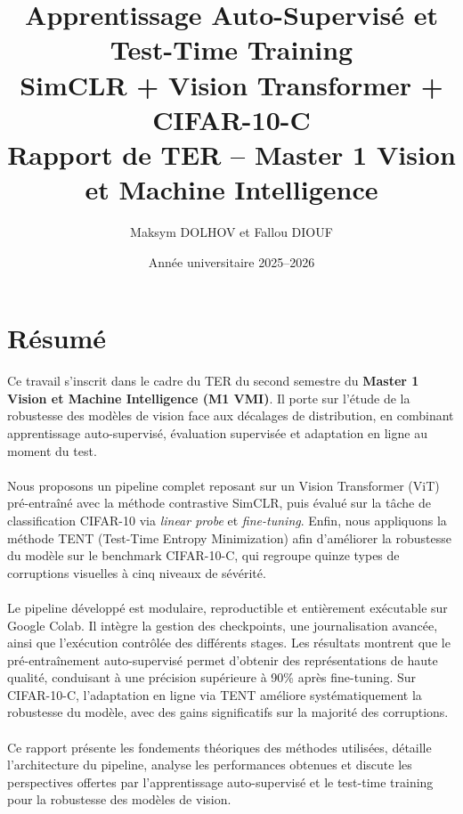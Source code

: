 \documentclass[12pt,a4paper]{report}
\title{%
	\textbf{Apprentissage Auto-Supervisé et Test-Time Training}\\
	\large SimCLR + Vision Transformer + CIFAR-10-C\\
	\large Rapport de TER – Master 1 Vision et Machine Intelligence
}
\author{Maksym DOLHOV et Fallou DIOUF}
\date{Année universitaire 2025–2026}
\begin{document}
	
	\maketitle
	\tableofcontents
	
	\chapter*{Résumé}
	Ce travail s’inscrit dans le cadre du TER du second semestre du \textbf{Master 1 Vision et Machine Intelligence (M1 VMI)}. Il porte sur l’étude de la robustesse des modèles de vision face aux décalages de distribution, en combinant apprentissage auto-supervisé, évaluation supervisée et adaptation en ligne au moment du test.\\ \\
	Nous proposons un pipeline complet reposant sur un Vision Transformer (ViT) pré-entraîné avec la méthode contrastive SimCLR, puis évalué sur la tâche de classification CIFAR-10 via \textit{linear probe} et \textit{fine-tuning}. Enfin, nous appliquons la méthode TENT (Test-Time Entropy Minimization) afin d’améliorer la robustesse du modèle sur le benchmark CIFAR-10-C, qui regroupe quinze types de corruptions visuelles à cinq niveaux de sévérité.\\ \\
	Le pipeline développé est modulaire, reproductible et entièrement exécutable sur Google Colab. Il intègre la gestion des checkpoints, une journalisation avancée, ainsi que l’exécution contrôlée des différents stages. Les résultats montrent que le pré-entraînement auto-supervisé permet d’obtenir des représentations de haute qualité, conduisant à une précision supérieure à 90\% après fine-tuning. Sur CIFAR-10-C, l’adaptation en ligne via TENT améliore systématiquement la robustesse du modèle, avec des gains significatifs sur la majorité des corruptions.\\\\
	Ce rapport présente les fondements théoriques des méthodes utilisées, détaille l’architecture du pipeline, analyse les performances obtenues et discute les perspectives offertes par l’apprentissage auto-supervisé et le test-time training pour la robustesse des modèles de vision.
	
\end{document}

